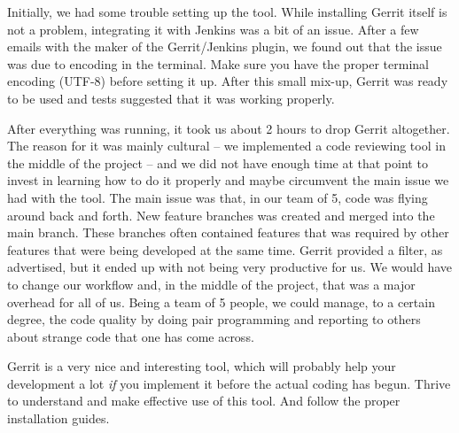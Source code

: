 Initially, we had some trouble setting up the tool. While installing Gerrit itself is not a problem, integrating it with Jenkins was a bit of an issue. After a few emails with the maker of the Gerrit/Jenkins plugin, we found out that the issue was due to encoding in the terminal. Make sure you have the proper terminal encoding (UTF-8) before setting it up. After this small mix-up, Gerrit was ready to be used and tests suggested that it was working properly.

After everything was running, it took us about 2 hours to drop Gerrit altogether. The reason for it was mainly cultural -- we implemented a code reviewing tool in the middle of the project -- and we did not have enough time at that point to invest in learning how to do it properly and maybe circumvent the main issue we had with the tool. The main issue was that, in our team of 5, code was flying around back and forth. New feature branches was created and merged into the main branch. These branches often contained features that was required by other features that were being developed at the same time. Gerrit provided a filter, as advertised, but it ended up with not being very productive for us. We would have to change our workflow and, in the middle of the project, that was a major overhead for all of us. Being a team of 5 people, we could manage, to a certain degree, the code quality by doing pair programming and reporting to others about strange code that one has come across.

Gerrit is a very nice and interesting tool, which will probably help your development a lot \emph{if} you implement it before the actual coding has begun. Thrive to understand and make effective use of this tool. And follow the proper installation guides.
